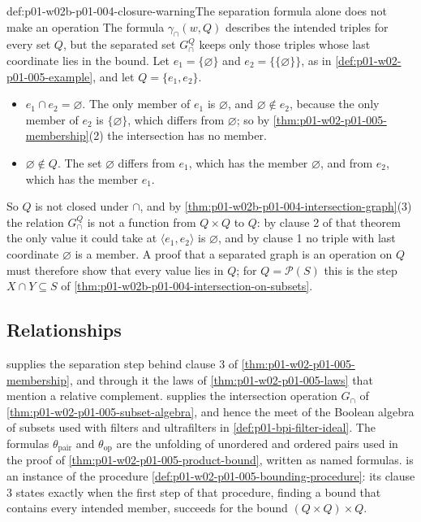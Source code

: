 \begin{hbwarning}{def:p01-w02b-p01-004-closure-warning}{The separation formula alone does not make an operation}
The formula \(\gamma_{\cap}(w,Q)\) describes the intended triples for every
set \(Q\), but the separated set \(G^{Q}_{\cap}\) keeps only those triples
whose last coordinate lies in the bound. Let \(e_1=\{\varnothing\}\) and
\(e_2=\{\{\varnothing\}\}\), as in \cref{def:p01-w02-p01-005-example}, and let
\(Q=\{e_1,e_2\}\).
\begin{itemize}
  \item \(e_1\cap e_2=\varnothing\). The only member of \(e_1\) is
        \(\varnothing\), and \(\varnothing\notin e_2\), because the only member
        of \(e_2\) is \(\{\varnothing\}\), which differs from \(\varnothing\);
        so by \cref{thm:p01-w02-p01-005-membership}(2) the intersection has no
        member.
  \item \(\varnothing\notin Q\). The set \(\varnothing\) differs from \(e_1\),
        which has the member \(\varnothing\), and from \(e_2\), which has the
        member \(e_1\).
\end{itemize}
So \(Q\) is not closed under \(\cap\), and by
\cref{thm:p01-w02b-p01-004-intersection-graph}(3) the relation
\(G^{Q}_{\cap}\) is not a function from \(Q\times Q\) to \(Q\): by clause 2 of
that theorem the only value it could take at \(\langle e_1,e_2\rangle\) is
\(\varnothing\), and by clause 1 no triple with last coordinate \(\varnothing\)
is a member. A proof that a separated graph is an operation on \(Q\) must
therefore show that every value lies in \(Q\); for \(Q=\mathcal P(S)\) this is
the step \(X\cap Y\subseteq S\) of
\cref{thm:p01-w02b-p01-004-intersection-on-subsets}.
\end{hbwarning}

\subsection{Relationships}
\label{sec:p01-w02b-p01-004-relationships}

 supplies the separation step
behind clause 3 of \cref{thm:p01-w02-p01-005-membership}, and through it the
laws of \cref{thm:p01-w02-p01-005-laws} that mention a relative complement.
 supplies the intersection
operation \(G_{\cap}\) of \cref{thm:p01-w02-p01-005-subset-algebra}, and hence
the meet of the Boolean algebra of subsets used with filters and ultrafilters in
\cref{def:p01-bpi-filter-ideal}. The formulas \(\theta_{\mathrm{pair}}\) and
\(\theta_{\mathrm{op}}\) are the unfolding of unordered and ordered pairs used
in the proof of \cref{thm:p01-w02-p01-005-product-bound}, written as named
formulas.  is an instance of the
procedure \cref{def:p01-w02-p01-005-bounding-procedure}: its clause 3 states
exactly when the first step of that procedure, finding a bound that contains
every intended member, succeeds for the bound \((Q\times Q)\times Q\).

